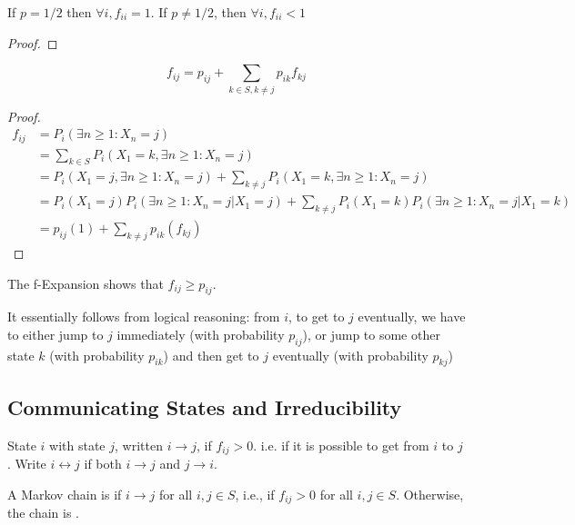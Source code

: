 \documentclass[11pt]{article}
\begin{document}
    If $p = 1/2$ then $\forall i, f_{ii} = 1$. If $p \neq 1/2$, then $\forall i, f_{ii} < 1$ 
    \begin{proof}
    \end{proof}
    
    \theorem[f-Expansion]
    $$f_{ij} = p_{ij} + \sum_{k \in S, k \neq j} p_{ik}f_{kj}$$
    \begin{proof}
    	\begin{align*}
    		f_{ij} &= P_i(\exists n \geq 1: X_n = j) \\
    		&= \sum_{k \in S} P_i(X_1 = k, \exists n \geq 1: X_n = j) \\
    		&= P_i(X_1 = j, \exists n \geq 1: X_n = j) + \sum_{k \neq j} P_i(X_1 = k, \exists n \geq 1: X_n = j) \\
    		&= P_i(X_1 = j)P_i(\exists n \geq 1: X_n = j | X_1 = j) + \sum_{k \neq j} P_i(X_1 = k)P_i( \exists n \geq 1: X_n = j | X_1 = k) \\
    		&= p_{ij}(1) + \sum_{k \neq j}p_{ik}(f_{kj})
    	\end{align*}
    \end{proof}
    
    \remark
    The f-Expansion shows that $f_{ij} \geq p_{ij}$.
    
    \remark
    It essentially follows from logical reasoning: from $i$, to get to $j$ eventually, we have to either jump to $j$ immediately (with probability $p_{ij}$), or jump to some other state $k$ (with probability $p_{ik}$) and then get to $j$ eventually (with probability $p_{kj}$)
    \subsection{Communicating States and Irreducibility}
     State $i$  with state $j$, written $i \rightarrow j$, if $f_{ij} > 0$.
    \remark
    i.e. if it is possible to get from $i$ to $j$.
    \notation
    Write $i \leftrightarrow j$ if both $i \rightarrow j$ and $j \rightarrow i$.
    
     A Markov chain is  if $i \rightarrow j$ for all $i, j \in S$, i.e., if $f_{ij} > 0$ for all $i, j \in S$. Otherwise, the chain is .
    
\end{document}
